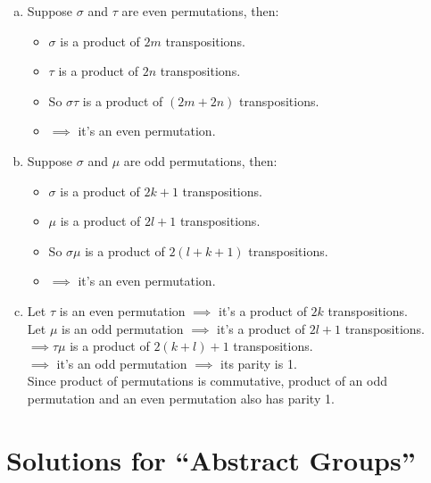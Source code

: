 \begin{enumerate}[(a)]
\item
Suppose $\sigma$ and $\tau$ are even permutations, then:
\begin{itemize}
\item
$\sigma$ is a product of $2m$ transpositions.
\item
$\tau$ is a product of $2n$ transpositions.
\item
So $\sigma\tau$ is a product of $(2m+2n)$ transpositions.
\item
$\implies$  it's an even permutation.
\end{itemize}
\item
 Suppose $\sigma$ and $\mu$ are odd permutations, then:
\begin{itemize}
\item
$\sigma$ is a product of $2k+1$ transpositions.
\item
$\mu$ is a product of $2l+1$ transpositions.
\item
So $\sigma\mu$ is a product of $2(l+k+1)$ transpositions.
\item
$\implies$  it's an even permutation.
\end{itemize}
\item
 Let $\tau$ is an even permutation $\implies$  it's a product of $2k$ transpositions.\\
Let $\mu$ is an odd permutation $\implies$  it's a product of $2l+1$ transpositions.\\
$\implies \tau\mu$ is a product of $2(k+l)+1$ transpositions.\\
$\implies$  it's an odd permutation $\implies$  its parity is 1.\\
Since product of permutations is commutative, product of an odd permutation and an even permutation also has parity 1.\\
\end{enumerate}

\section{Solutions for  ``Abstract Groups''}
\noindent{}\bigskip

